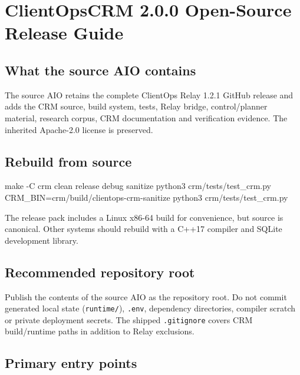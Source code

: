 \documentclass[
]{article}
\author{}
\date{}
\newenvironment{Shaded}{}{}
\newcommand{\AttributeTok}[1]{\textcolor[rgb]{0.49,0.56,0.16}{#1}}
\newcommand{\ExtensionTok}[1]{#1}
\newcommand{\FunctionTok}[1]{\textcolor[rgb]{0.02,0.16,0.49}{#1}}
\newcommand{\NormalTok}[1]{#1}
\newcommand{\OperatorTok}[1]{\textcolor[rgb]{0.40,0.40,0.40}{#1}}
\newcommand{\VariableTok}[1]{\textcolor[rgb]{0.10,0.09,0.49}{#1}}
\begin{document}
\section{ClientOpsCRM 2.0.0 Open-Source Release
Guide}\label{clientopscrm-200-open-source-release-guide}

\subsection{What the source AIO
contains}\label{what-the-source-aio-contains}

The source AIO retains the complete ClientOps Relay 1.2.1 GitHub release
and adds the CRM source, build system, tests, Relay bridge,
control/planner material, research corpus, CRM documentation and
verification evidence. The inherited Apache-2.0 license is preserved.

\subsection{Rebuild from source}\label{rebuild-from-source}

\begin{Shaded}
\begin{Highlighting}[]
\FunctionTok{make} \AttributeTok{{-}C}\NormalTok{ crm clean release debug sanitize}
\ExtensionTok{python3}\NormalTok{ crm/tests/test\_crm.py}
\VariableTok{CRM\_BIN}\OperatorTok{=}\NormalTok{crm/build/clientops{-}crm{-}sanitize }\ExtensionTok{python3}\NormalTok{ crm/tests/test\_crm.py}
\end{Highlighting}
\end{Shaded}

The release pack includes a Linux x86-64 build for convenience, but
source is canonical. Other systems should rebuild with a C++17 compiler
and SQLite development library.

\subsection{Recommended repository
root}\label{recommended-repository-root}

Publish the contents of the source AIO as the repository root. Do not
commit generated local state (\texttt{runtime/}), \texttt{.env},
dependency directories, compiler scratch or private deployment secrets.
The shipped \texttt{.gitignore} covers CRM build/runtime paths in
addition to Relay exclusions.

\subsection{Primary entry points}\label{primary-entry-points}
\end{document}
